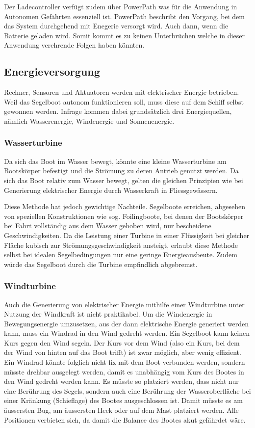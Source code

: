 Der Ladecontroller verfügt zudem über PowerPath was für die Anwendung in Autonomen Gefährten essenziell ist. PowerPath beschribt den Vorgang, bei dem das System durchgehend mit Enegerie versorgt wird. Auch dann, wenn die Batterie geladen wird. Somit kommt es zu keinen Unterbrüchen welche in dieser Anwendung verehrende Folgen haben könnten. 


\subsection{Energieversorgung}

Rechner, Sensoren und Aktuatoren werden mit elektrischer Energie betrieben. Weil das Segelboot autonom funktionieren soll, muss diese auf dem Schiff selbst gewonnen werden. Infrage kommen dabei grundsätzlich drei Energiequellen, nämlich Wasserenergie, Windenergie und Sonnenenergie.

\subsubsection{Wasserturbine}
Da sich das Boot im Wasser bewegt, könnte eine kleine Wasserturbine am Bootskörper befestigt und die Strömung zu deren Antrieb genutzt werden. Da sich das Boot relativ zum Wasser bewegt, gelten die gleichen Prinzipien wie bei Generierung elektrischer Energie durch Wasserkraft in Fliessgewässern.

Diese Methode hat jedoch gewichtige Nachteile. Segelboote erreichen, abgesehen von speziellen Konstruktionen wie sog. Foilingboote, bei denen der Bootskörper bei Fahrt vollständig aus dem Wasser gehoben wird, nur bescheidene Geschwindigkeiten. Da die Leistung einer Turbine in einer Flüssigkeit bei gleicher Fläche kubisch zur Strömungsgeschwindigkeit ansteigt, erlaubt diese Methode selbst bei idealen Segelbedingungen nur eine geringe Energieausbeute. Zudem würde das Segelboot durch die Turbine empfindlich abgebremst. 

\subsubsection{Windturbine}
Auch die Generierung von elektrischer Energie mithilfe einer Windturbine unter Nutzung der Windkraft ist nicht praktikabel. Um die Windenergie in Bewegungsenergie umzusetzen, aus der dann elektrische Energie generiert werden kann, muss ein Windrad in den Wind gedreht werden. Ein Segelboot kann keinen Kurs gegen den Wind segeln. Der Kurs vor dem Wind (also ein Kurs, bei dem der Wind von hinten auf das Boot trifft) ist zwar möglich, aber wenig effizient. Ein Windrad könnte folglich nicht fix mit dem Boot verbunden werden, sondern müsste drehbar ausgelegt werden, damit es unabhängig vom Kurs des Bootes in den Wind gedreht werden kann. Es müsste so platziert werden, dass nicht nur eine Berührung des Segels, sondern auch eine Berührung der Wasseroberfläche bei einer Kränkung (Schieflage) des Bootes ausgeschlossen ist. Damit müsste es am äussersten Bug, am äussersten Heck oder auf dem Mast platziert werden. Alle Positionen verbieten sich, da damit die Balance des Bootes akut gefährdet wäre. 

